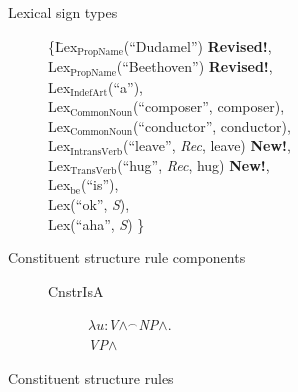 \begin{description}



\item[Lexical sign types] \mbox{}

\begin{tabbing}
    \{\=Lex$_{\mathrm{PropName}}$(``Dudamel'') \textbf{Revised!}, \\
\> Lex$_{\mathrm{PropName}}$(``Beethoven'') \textbf{Revised!}, \\
\> Lex$_{\mathrm{IndefArt}}$(``a''), \\
\> Lex$_{\text{CommonNoun}}$(``composer'', composer), \\
\> Lex$_{\text{CommonNoun}}$(``conductor'', conductor), \\
\> Lex$_{\mathrm{IntransVerb}}$(``leave'', \textit{Rec}, leave)
\textbf{New!}, \\
\> Lex$_{\mathrm{TransVerb}}$(``hug'', \textit{Rec}, hug)
\textbf{New!}, \\
\> Lex$_{\mathrm{be}}$(``is''), \\
\> Lex(``ok'', \textit{S}),  \\
\> Lex(``aha'', \textit{S})  \}
\end{tabbing}

\item[Constituent structure rule components] \mbox{}
  \begin{description}

    \item[\textnormal{CnstrIsA}] \mbox{}

  $\lambda
u$:\textit{V}\d{$\wedge$}$^{\frown}$\textit{NP}\d{$\wedge$}. \\
\hspace*{1em} \textit{VP}\d{$\wedge$} 

  \end{description}
  


\item[Constituent structure rules] \mbox{}
  

\end{description}
